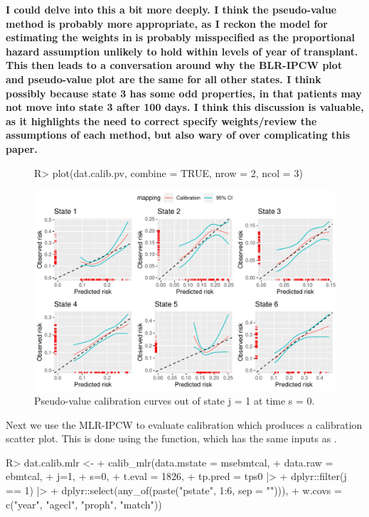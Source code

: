 \documentclass[article,shortnames]{jss}
\begin{document}
\textbf{I could delve into this a bit more deeply. I think the pseudo-value method is probably more appropriate, as I reckon the model for estimating the weights in}  \textbf{is probably misspecified as the proportional hazard assumption unlikely to hold within levels of year of transplant. This then leads to a conversation around why the BLR-IPCW plot and pseudo-value plot are the same for all other states. I think possibly because state 3 has some odd properties, in that patients may not move into state 3 after 100 days. I think this discussion is valuable, as it highlights the need to correct specify weights/review the assumptions of each method, but also wary of over complicating this paper.}

\begin{figure}
\centering
\begin{Schunk}
\begin{Sinput}
R> plot(dat.calib.pv, combine = TRUE, nrow = 2, ncol = 3)
\end{Sinput}
\end{Schunk}
\includegraphics{calibmsm-jss-TEST-008}
\caption{\label{fig:pvj1s0} Pseudo-value calibration curves out of state j =  1 at time s = 0.}
\end{figure}

Next we use the MLR-IPCW to evaluate calibration which produces a calibration scatter plot. This is done using the  function, which has the same inputs as .

\begin{Schunk}
\begin{Sinput}
R> dat.calib.mlr <-
+    calib_mlr(data.mstate = msebmtcal,
+                   data.raw = ebmtcal,
+                   j=1,
+                   s=0,
+                   t.eval = 1826,
+                   tp.pred = tps0 |>
+                     dplyr::filter(j == 1) |>
+                     dplyr::select(any_of(paste("pstate", 1:6, sep = ""))),
+                   w.covs = c("year", "agecl", "proph", "match"))
\end{Sinput}
\end{Schunk}
\end{document}
